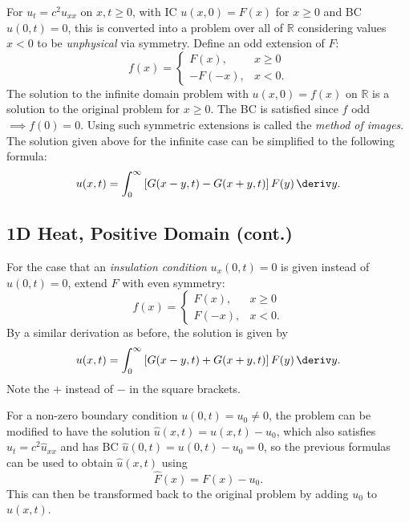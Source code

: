 \documentclass[10pt, a4paper]{article}
\begin{document}
\begin{landscape}
\begin{multicols*}{2}
    For \(u_t = c^2 u_{xx}\) on \(x, t \geq 0\), with IC \(u(x, 0) = F(x)\) for \(x \geq 0\) and BC
    \(u(0, t) = 0\), this is converted into a problem over all of \(\mathbb{R}\) considering
    values \(x < 0\) to be \emph{unphysical} via symmetry. Define an odd extension of \(F\):
    \[
        f(x) = \begin{cases}
            F(x), & x \geq 0 \\
            -F(-x), & x < 0.
        \end{cases}
    \]
    The solution to the infinite domain problem with \(u(x, 0) = f(x)\) on \(\mathbb{R}\) is a solution to the
    original problem for \(x \geq 0\). The BC is satisfied since \(f\) odd \(\implies f(0) = 0\).
    Using such symmetric extensions is called the \emph{method of images}.
    The solution given above for the infinite case can be simplified to the following formula:
    \[
        u(x, t) = \int_0^{\infty} \left[G(x-y, t) - G(x+y, t)\right] F(y) \,\deriv y.
    \]

\end{multicols*}

\pagebreak

\begin{multicols*}{2}

    \section{1D Heat, Positive Domain (cont.)}

    For the case that an \emph{insulation condition} \(u_x(0, t) = 0\) is given instead of \(u(0, t) = 0\),
    extend \(F\) with even symmetry:
    \[
        f(x) = \begin{cases}
            F(x), & x \geq 0 \\
            F(-x), & x < 0.
        \end{cases}
    \]
    By a similar derivation as before, the solution is given by
    \[
        u(x, t) = \int_0^{\infty} \left[G(x-y, t) + G(x+y, t)\right] F(y) \,\deriv y.
    \]
    Note the \(+\) instead of \(-\) in the square brackets.

    For a non-zero boundary condition \(u(0, t) = u_0 \neq 0\), the problem can be modified
    to have the solution \(\hat u(x, t) = u(x, t) - u_0\), which also satisfies \(\hat u_t = c^2 \hat u_{xx}\)
    and has BC \(\hat u(0, t) = u(0, t) - u_0 = 0\), so the previous formulas can be used to obtain \(\hat u(x, t)\)
    using
    \[
        \hat F(x) = F(x) - u_0.
    \]
    This can then be transformed back to the original problem by adding \(u_0\) to \(\hat u(x, t)\).


\end{multicols*}
\end{landscape}
\end{document}
